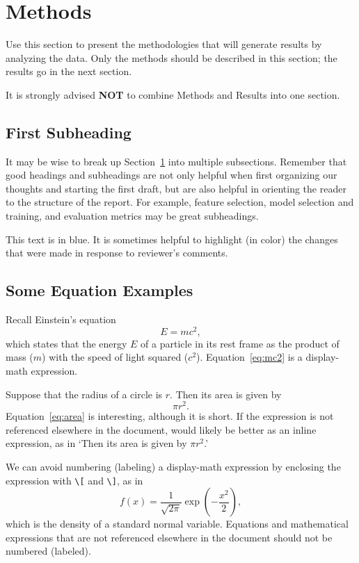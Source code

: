 \documentclass[12pt]{article}
\newcommand{\blue}{\color{blue}}
\begin{document}
\section{Methods}
\label{sec:meth}

Use this section to present the methodologies that will generate results by
analyzing the data. Only the methods should be described in this section; the 
results go in the next section.  

It is strongly advised \textbf{NOT} to combine Methods and Results into one 
section.  


\subsection{First Subheading}

It may be wise to break up Section~\ref{sec:meth} into multiple subsections.
Remember that good headings and subheadings are not only helpful when first
organizing our thoughts and starting the first draft, but are also helpful in 
orienting the reader to the structure of the report.  For example, feature 
selection, model selection and training, and evaluation metrics may be great subheadings.  


{\blue This text is in blue. It is sometimes helpful to highlight (in color) the 
changes that were made in response to reviewer's comments.}


\subsection{Some Equation Examples}

Recall Einstein's equation
\begin{equation}
  \label{eq:mc2}
  E = m c^2,
\end{equation}
which states that the energy $E$ of a particle in its rest frame as the product
of mass ($m$) with the speed of light squared ($c^2$). Equation~\eqref{eq:mc2} 
is a display-math expression.


Suppose that the radius of a circle is $r$. Then its area is given by
\begin{equation}
  \label{eq:area}
   \pi r^2.
\end{equation}
%
Equation~\eqref{eq:area} is interesting, although it is short. If the expression 
is not referenced elsewhere in the document, would likely be better as an inline 
expression, as in `Then its area is given by $\pi r^2$.' 


We can avoid numbering (labeling) a display-math expression by enclosing the 
expression with \verb|\[| and \verb|\]|, as in
\[
  f(x) = \frac{1}{\sqrt{2\pi}} \exp\left( - \frac{x^2}{2} \right),
\]
which is the density of a standard normal variable.  Equations and mathematical
expressions that are not referenced elsewhere in the document should not be 
numbered (labeled). 
\end{document}
